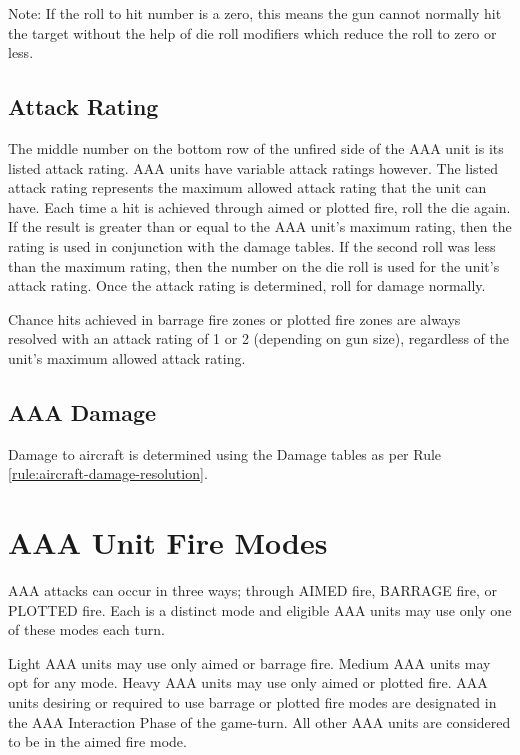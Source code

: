 Note:  If the roll to hit number is a zero, this means the gun cannot normally hit the target without the help of die roll modifiers which reduce the roll to zero or less.

\subsection{Attack Rating} The middle number on the bottom row of the unfired side of the AAA unit is its listed attack rating. AAA units have variable attack ratings however. The listed attack rating represents the maximum allowed attack rating that the unit can have. Each time a hit is achieved through aimed or plotted fire, roll the die again. If the result is greater than or equal to the AAA unit's maximum rating, then the rating is used in conjunction with the damage tables. If the second roll was less than the maximum rating, then the number on the die roll is used for the unit's attack rating. Once the attack rating is determined, roll for damage normally.

Chance hits achieved in barrage fire zones or plotted fire zones are always resolved with an attack rating of 1 or 2 (depending on gun size), regardless of the unit's maximum allowed attack rating.




\subsection{AAA Damage} Damage to aircraft is determined using the Damage tables as per Rule \ref{rule:aircraft-damage-resolution}.

\section{AAA Unit Fire Modes}

AAA attacks can occur in three ways; through AIMED fire, BARRAGE fire, or PLOTTED fire. Each is a distinct mode and eligible AAA units may use only one of these modes each turn.

Light AAA units may use only aimed or barrage fire. Medium AAA units may opt for any mode. Heavy AAA units may use only aimed or plotted fire. AAA units desiring or required to use barrage or plotted fire modes are designated in the AAA Interaction Phase of the game-turn. All other AAA units are considered to be in the aimed fire mode.

